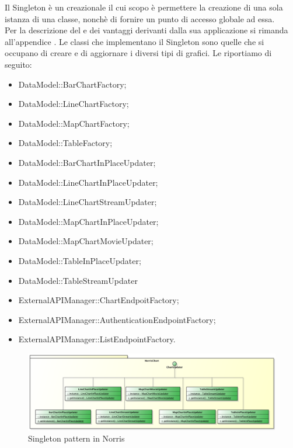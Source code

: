 			Il Singleton è un  creazionale il cui scopo è permettere la creazione di una sola istanza di una classe, nonchè di fornire un punto di accesso globale ad essa.\\
			Per la descrizione del  e dei vantaggi derivanti dalla sua applicazione si rimanda all'appendice .
				Le classi che implementano il Singleton sono quelle che si occupano di creare e di aggiornare i diversi tipi di grafici. Le riportiamo di seguito:
				\begin{itemize}
					\item DataModel::BarChartFactory;
					\item DataModel::LineChartFactory;
					\item DataModel::MapChartFactory;
					\item DataModel::TableFactory;
					\item DataModel::BarChartInPlaceUpdater;
					\item DataModel::LineChartInPlaceUpdater;
					\item DataModel::LineChartStreamUpdater;
					\item DataModel::MapChartInPlaceUpdater;
					\item DataModel::MapChartMovieUpdater;
					\item DataModel::TableInPlaceUpdater;
					\item DataModel::TableStreamUpdater
					\item ExternalAPIManager::ChartEndpoitFactory;
					\item ExternalAPIManager::AuthenticationEndpointFactory;
					\item ExternalAPIManager::ListEndpointFactory.
				\end{itemize}
				\begin{figure}[H]\centering
	        		\includegraphics[width=\textwidth]{SpecificaTecnica/Pics/DesignPatternNorris/Singleton1}
	        		\caption{Singleton pattern in Norris}
	    		\end{figure}
